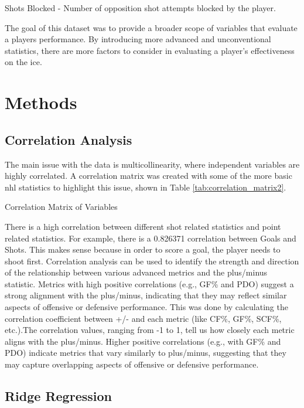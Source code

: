 \documentclass[12pt]{article}
\begin{document}
Shots Blocked - Number of opposition shot attempts blocked by the player.


The goal of this dataset was to provide a broader scope of variables that evaluate a players performance. By introducing more
advanced and unconventional statistics, there are more factors to consider in evaluating a player's effectiveness on the ice.


\section{Methods}
\label{sec:meth}

\subsection{Correlation Analysis}
The main issue with the data is multicollinearity, where independent variables are highly correlated. A correlation matrix was created 
with some of the more basic nhl statistics to highlight this issue, shown in Table \ref{tab:correlation_matrix2}.

\begin{table}[h!]
  \centering
  \scriptsize
  \caption{Correlation Matrix of Variables}
  
  \label{tab:correlation_matrix2}
\end{table}


There is a high correlation between different shot related statistics and point related statistics. For example, there is a 
0.826371 correlation between Goals and Shots. This makes sense because in order to score a goal, the player needs to shoot first.
Correlation analysis can be used to identify the strength and direction of the relationship between various advanced metrics and 
the plus/minus statistic. Metrics with high positive correlations (e.g., GF\% and PDO) suggest a strong alignment with the plus/minus, 
indicating that they may reflect similar aspects of offensive or defensive performance. This was done by calculating the correlation 
coefficient between +/- and each metric (like CF\%, GF\%, SCF\%, etc.).The correlation values, ranging from -1 to 1, tell us how closely 
each metric aligns with the plus/minus. Higher positive correlations (e.g., with GF\% and PDO) indicate metrics that vary similarly to 
plus/minus, suggesting that they may capture overlapping aspects of offensive or defensive performance.

\subsection{Ridge Regression}
\end{document}
